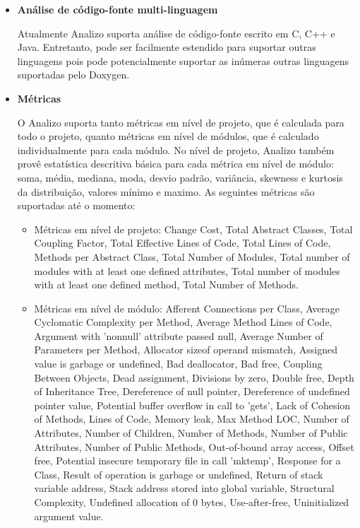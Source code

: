 \begin{itemize}

\item {\bf Análise de código-fonte multi-linguagem}

Atualmente Analizo suporta análise de código-fonte escrito em C, C++ e Java.
Entretanto, pode ser facilmente estendido para suportar outras linguagens pois
pode potencialmente suportar as inúmeras outras linguagens suportadas pelo Doxygen.

\item {\bf Métricas}\label{metricas}

O Analizo suporta tanto métricas em nível de projeto, que é calculada para todo o projeto,
quanto métricas em nível de módulos, que é calculado individualmente para cada módulo.
No nível de projeto, Analizo também provê estatística descritiva básica para cada métrica em
nível de módulo: soma, média, mediana, moda, desvio padrão, variância, skewness e kurtosis da
distribuição, valores mínimo e maximo. As seguintes métricas são suportadas até o momento:

\begin{itemize}

  \item Métricas em nível de projeto: Change Cost, Total Abstract Classes,
  Total Coupling Factor, Total Effective Lines of Code, Total Lines of Code,
  Methods per Abstract Class, Total Number of Modules, Total number of modules
  with at least one defined attributes, Total number of modules with at least
  one defined method, Total Number of Methods.

  \item Métricas em nível de módulo: Afferent Connections per Class, Average
  Cyclomatic Complexity per Method, Average Method Lines of Code, Argument with
  'nonnull' attribute passed null, Average Number of Parameters per Method,
  Allocator sizeof operand mismatch, Assigned value is garbage or undefined,
  Bad deallocator, Bad free, Coupling Between Objects, Dead assignment,
  Divisions by zero, Double free, Depth of Inheritance Tree, Dereference of
  null pointer, Dereference of undefined pointer value, Potential buffer
  overflow in call to 'gets', Lack of Cohesion of Methods, Lines of Code,
  Memory leak, Max Method LOC, Number of Attributes, Number of Children, Number
  of Methods, Number of Public Attributes, Number of Public Methods,
  Out-of-bound array access, Offset free, Potential insecure temporary file in
  call 'mktemp', Response for a Class, Result of operation is garbage or
  undefined, Return of stack variable address, Stack address stored into global
  variable, Structural Complexity, Undefined allocation of 0 bytes,
  Use-after-free, Uninitialized argument value.


\end{itemize}
\end{itemize}
